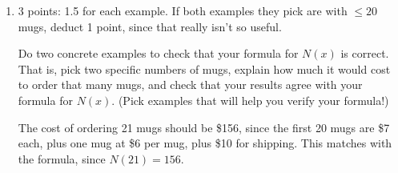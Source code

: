 \documentclass{article}
\providecommand{\check}{}
\renewcommand{\check}{\ifmmode{\text{ \ding{51} }}\else{\ding{51} }\fi}
\begin{document}
\begin{enumerate}
\begin{enumerate}
    \begin{grading} 
      4 points: 1 for the formula for each piece, plus 1 point for specifying appropriate domains for each piece.

      Of course, students might simplify $150 + 6 (x - 20)$ to $6x + 30$ and $450 + 5 (x - 70)$ to $5x + 100$. Also, they might differ on where they put $\leq$ or $<$ in their descriptions of what $x$ each piece applies to (like they might say the first piece is $0 \leq x < 20$ and the second piece is $20 \leq x \leq 70$). Again, it's okay if their domain starts at $x = 1$. 
    \end{grading} 

    \begin{problem}[\vfill\newpage]
      Find a formula for $N(x)$. Be sure to communicate your reasoning clearly. 
    \end{problem}

    \begin{solution} 
      \[
        N(x) = \begin{cases}              
          10+7x& \text{if $0 \leq x \leq 20$ }\\
          150+6(x-20) & \text{if $20 < x \leq 70$}\\
          450+5(x-70) & \text{if $70 < x$}
        \end{cases}
      \]
    \end{solution}

  \item

    \begin{grading}
      3 points: 1.5 for each example. If both examples they pick are with $\leq 20$ mugs, deduct 1 point, since that really isn't so useful.
    \end{grading}

    \begin{problem}[\vfill]
      \check Do two concrete examples to check that your formula for $N(x)$ is correct. That is, pick two specific numbers of mugs, explain how much it would cost to order that many mugs, and check that your results agree with your formula for $N(x)$. (Pick examples that will help you verify your formula!) 
    \end{problem}

    \begin{solution}
      The cost of ordering 21 mugs should be \$156, since the first 20 mugs are \$7 each, plus
      one mug at \$6 per mug, plus \$10 for shipping. This matches with the formula, since
      $N(21)=156$. 


\end{solution}
\end{enumerate}
\end{enumerate}
\end{document}
